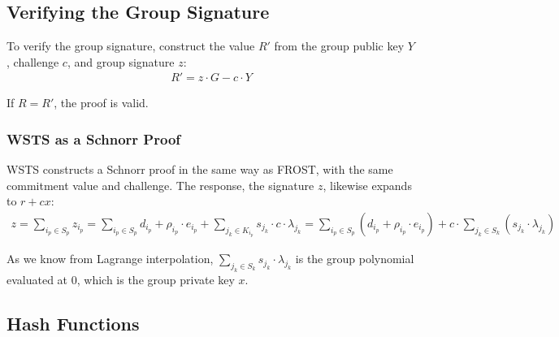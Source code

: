 \documentclass{article}
\theoremstyle{plain}
\theoremstyle{definition}
\theoremstyle{remark}
\begin{document}
\subsection{
  Verifying the Group Signature
}

To verify the group signature, construct the value $R'$ from the group public key $Y$, challenge $c$, and group signature $z$:
\begin{align}\label{equation:wsts-verify}
  R' = z \cdot G - c \cdot Y
\end{align}

If $R = R'$, the proof is valid.

\subsubsection{
  WSTS as a Schnorr Proof
}\label{section:wsts-schnorr}

WSTS constructs a Schnorr proof in the same way as FROST, with the same commitment value and challenge.  The response, the signature $z$, likewise expands to $r + cx$:
\begin{align}
  z = \sum_{i_p \in S_p}^{} z_{i_p} = \sum_{i_p \in S_p}^{} d_{i_p} + \rho_{i_p} \cdot e_{i_p} + \sum_{j_k \in K_{i_p}}^{} s_{j_k} \cdot c \cdot \lambda_{j_k} = \sum_{i_p \in S_p}^{} (d_{i_p} + \rho_{i_p} \cdot e_{i_p}) + c \cdot \sum_{j_k \in S_k}^{} (s_{j_k} \cdot \lambda_{j_k})\nonumber
\end{align}

As we know from Lagrange interpolation, $\sum_{j_k \in S_k}^{} s_{j_k} \cdot \lambda_{j_k}$ is the group polynomial evaluated at $0$, which is the group private key $x$.


\subsection{
  Hash Functions
}\label{section:hashes}
\end{document}
